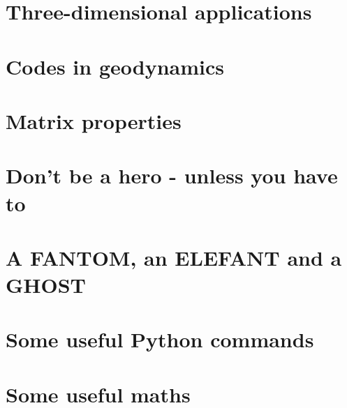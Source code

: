 \documentclass[a4paper]{article}
\begin{document}
\appendix %

\newpage %
\section{Three-dimensional applications}  %
\newpage %
\section{Codes in geodynamics \label{app:codes} } %
\newpage %
\section{Matrix properties}  %
\newpage %
\section{Don’t be a hero - unless you have to}  %
\newpage %
\section{A FANTOM, an ELEFANT and a GHOST}  %
\newpage %
\section{Some useful Python commands}  %
\newpage %
\section{Some useful maths}  \label{app_maths} %
\newpage %
\end{document}
